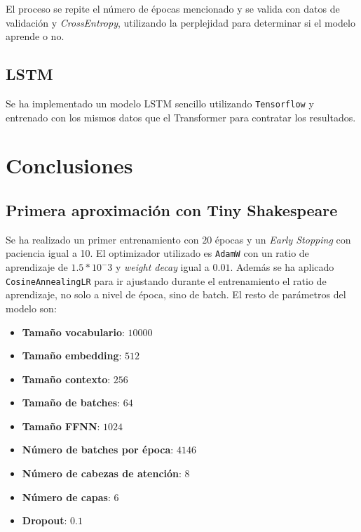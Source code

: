 \documentclass[11pt]{book}
\newcommand{\clearemptydoublepage}{\newpage{\pagestyle{empty}\cleardoublepage}}
\theoremstyle{plain}
\theoremstyle{definition}
\begin{document}
El proceso se repite el número de épocas mencionado y se valida con datos de validación y \textit{CrossEntropy}, utilizando la perplejidad para determinar si el modelo aprende o no.


\section{LSTM}

Se ha implementado un modelo LSTM sencillo utilizando \texttt{Tensorflow} y entrenado con los mismos datos que el Transformer para contratar los resultados. 





\clearemptydoublepage

\chapter{Conclusiones}

\section{Primera aproximación con Tiny Shakespeare}

Se ha realizado un primer entrenamiento con $20$ épocas y un \textit{Early Stopping} con paciencia igual a 10. El optimizador utilizado es \texttt{AdamW} con un ratio de aprendizaje de $1.5*10^-3$ y \textit{weight decay} igual a $0.01$. Además se ha aplicado \texttt{CosineAnnealingLR} para ir ajustando durante el entrenamiento el ratio de aprendizaje, no solo a nivel de época, sino de batch. El resto de parámetros del modelo son: 

\begin{itemize}
    \item \textbf{Tamaño vocabulario}: $10000$
    \item \textbf{Tamaño embedding}: $512$
    \item \textbf{Tamaño contexto}: $256$
    \item \textbf{Tamaño de batches}: $64$
    \item \textbf{Tamaño FFNN}: $1024$
    \item \textbf{Número de batches por época}: $4146$
    \item \textbf{Número de cabezas de atención}: $8$
    \item \textbf{Número de capas}: $6$
    \item \textbf{Dropout}: $0.1$
\end{itemize}
\end{document}

